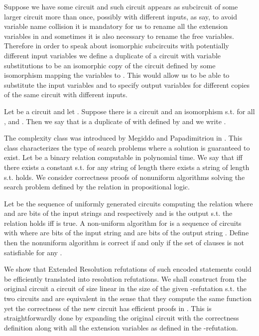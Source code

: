 \documentclass{LMCS}
\theoremstyle{plain}\newtheorem{satz}[thm]{Satz}
\begin{document}
\noindent Suppose we have some circuit  and such circuit appears as subcircuit of some larger circuit more than once, possibly with different inputs, as  say, to avoid variable name collision it is mandatory for us to rename all the extension variables in  and sometimes it is also necessary to rename the free variables. Therefore in order to speak about isomorphic subcircuits with potentially different input variables we define a duplicate of a circuit  with variable substitutions  to be an isomorphic copy of the circuit  defined by some isomorphism  mapping the variables  to . This would allow us to be able to substitute the input variables and to specify output variables for different copies of the same circuit with different inputs.

\begin{defi}
Let  be a circuit and let . Suppose there is a circuit  and an isomorphism  s.t.  for all ,   and . Then we say that  is a duplicate of  with  defined by  and we write .
\end{defi}

The complexity class  was introduced by Megiddo and Papadimitriou in \cite{MR1107721}. This class characterizes the type of  search problems where a solution is guaranteed to exist. Let  be a binary relation computable in polynomial time. We say that  iff there exists a constant  s.t. for any string  of length  there exists a string  of length  s.t.  holds. We consider correctness proofs of nonuniform algorithms solving the  search problem defined by the relation  in propositional logic.

Let  be the sequence of uniformly generated circuits computing the relation  where  and  are bits of the input strings  and  respectively and  is the output s.t. the relation  holds iff  is true. A non-uniform algorithm for  is a sequence of circuits  with  where  are bits of the input string  and  are bits of the output string . Define  then the nonuniform algorithm is correct if and only if the set of clauses  is not satisfiable for any .

We show that Extended Resolution refutations of such encoded statements could be efficiently translated into resolution refutations. We shall construct from the original circuit  a circuit  of size linear in the size of the given -refutation s.t. the two circuits  and  are equivalent in the sense that they compute the same function yet the correctness of the new circuit  has efficient proofs in . This is straightforwardly done by expanding the original circuit  with the correctness definition  along with all the extension variables as defined in the -refutation.
\end{document}
